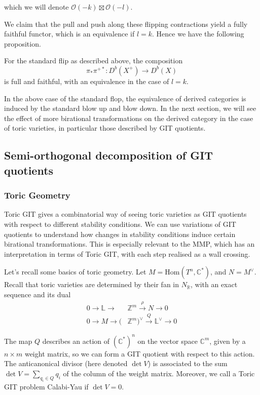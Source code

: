 which we will denote $\mathcal{O}(-k) \boxtimes\mathcal{O}(-l)$. 

We claim that the pull and push along these flipping contractions yield a fully faithful functor, which is an equivalence if $l = k$. Hence we have the following proposition. 

\begin{theorem}{}{}
    For the standard flip as described above, the composition $$
\pi_{*}\pi^{+*}: D^{b}(X^+)\to D^{b}(X)
$$ is full and faithful, with an equivalence in the case of $l =k$. 
\end{theorem}

In the above case of the standard flop, the equivalence of derived categories is induced by the standard blow up and blow down. In the next section, we will see the effect of more birational transformations on the derived category in the case of toric varieties, in particular those described by GIT quotients. 



\subsection{Semi-orthogonal decomposition of GIT quotients}

\subsubsection{Toric Geometry}

Toric GIT gives a combinatorial way of seeing toric varieties as GIT quotients with respect to different stability conditions. We can use variations of GIT quotients to understand how changes in stability conditions induce certain birational transformations. This is especially relevant to the MMP, which has an interpretation in terms of Toric GIT, with each step realised as a wall crossing.

Let's recall some basics of toric geometry. Let $M = \mathrm{Hom}(T^{n}, \mathbb{C}^*)$, and $N = M^{\vee}$. Recall that toric varieties are determined by their fan in $N_\mathbb{R}$, with an exact sequence and its dual
\begin{align*}
0 \to \mathbb{L}\to &\mathbb{Z}^{m}\xrightarrow{\rho}N \to 0 \\
0 \to M \to (&\mathbb{Z}^{m})^{\vee} \xrightarrow{Q} \mathbb{L}^{\vee}\to {0}
\end{align*}

The map $Q$ describes an action of $(\mathbb{C}^{*})^n$ on the vector space $\mathbb{C}^m$, given by a $n\times m$ weight matrix, so we can form a GIT quotient with respect to this action.  The anticanonical divisor (here denoted $\det V$) is associated to the sum $\det V = \sum_{q_{i}\in Q}q_i$ of the column of the weight matrix. Moreover, we call a Toric GIT problem Calabi-Yau if $\det V = 0$.  

